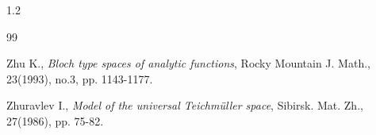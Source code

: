 \documentclass[11pt]{amsart}
\theoremstyle{remark}
\theoremstyle{claim}
\theoremstyle{definition}
\theoremstyle{problem}
\theoremstyle{conjecture}
\theoremstyle{question}
\numberwithin{equation}{section}
\begin{document}
\begin{spacing}{1.2}
\begin{thebibliography}{99}

Zhu K.,  {\em  Bloch type spaces of analytic functions},  Rocky Mountain J. Math., 23(1993), no.3, pp. 1143-1177.

Zhuravlev I., {\em Model of the universal Teichm\"uller space},  Sibirsk. Mat. Zh., 27(1986), pp. 75-82.

\end{thebibliography}
\end{spacing}
\end{document}

